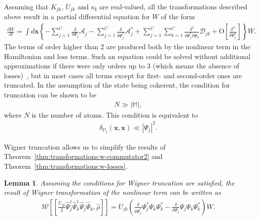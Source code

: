 \documentclass[12pt,aip,jmp,amssymb,amsmath]{revtex4-1}
\newtheorem{lemma}{Lemma}
\begin{document}
Assuming that $K_{jk}$, $U_{jk}$ and $\kappa_{\boldsymbol{l}}$ are real-valued, all the transformations described above result in a partial differential equation for $W$ of the form
\begin{eqnarray}
    \frac{\partial W}{\partial t} = \int d\boldsymbol{x} \left\{
        - \sum_{j=1}^C \frac{\delta}{\delta \Psi_j} \mathcal{A}_j
        - \sum_{j=1}^C \frac{\delta}{\delta \Psi_j^*} \mathcal{A}_j^*
        + \sum_{j=1}^C \sum_{k=1}^C \frac{\delta^2}{\delta \Psi_j^* \delta \Psi_k} \mathcal{D}_{jk}
        + \mbox{O} \left[ \frac{\delta^3}{\delta\Psi_j^3} \right]
    \right\} W.
\end{eqnarray}
The terms of order higher than 2 are produced both by the nonlinear term in the Hamiltonian and loss terms.
Such an equation could be solved without additional approximations if there were only orders up to 3 (which means the absence of losses)~\cite{Polkovnikov2003}, but in most cases all terms except for first- and second-order ones are truncated.
In the assumption of the state being coherent, the condition for truncation can be shown to be~\cite{Sinatra2002}
\begin{eqnarray}
    N \gg |\mathbb{M}|,
\end{eqnarray}
where $N$ is the number of atoms.
This condition is equivalent to~\cite{Norrie2006}
\begin{eqnarray}
    \delta_{\mathbb{M}_j}(\boldsymbol{x}, \boldsymbol{x}) \ll | \Psi_j |^2.
\end{eqnarray}

Wigner truncation allows us to simplify the results of Theorem~\ref{thm:transformations:w-commutator2} and Theorem~\ref{thm:transformations:w-losses}.

\begin{lemma}
    Assuming the conditions for Wigner truncation are satisfied,
    the result of Wigner transformation of the nonlinear term can be written as
    \begin{eqnarray*}
        \mathcal{W} \left[
            [
                \frac{U_{jk}}{2}
                    \hat{\Psi}_j^\dagger \hat{\Psi}_k^\dagger \hat{\Psi}_j \hat{\Psi}_k,
                \hat{\rho}
            ]
        \right]
        = U_{jk} \left(
            \frac{\delta}{\delta \Psi_j^*} \Psi_j^* \Psi_k \Psi_k^*
            - \frac{\delta}{\delta \Psi_j} \Psi_j \Psi_k \Psi_k^*
        \right) W.
    \end{eqnarray*}
\end{lemma}
\end{document}
